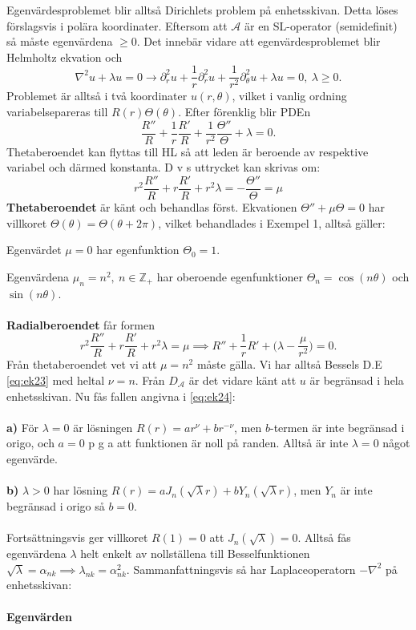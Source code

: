 \documentclass{article}
\begin{document}
Egenvärdesproblemet blir alltså Dirichlets problem på enhetsskivan. Detta löses förslagsvis i polära koordinater. Eftersom att $\mathcal{A}$ är en SL-operator (semidefinit) så måste egenvärdena $\geq 0$. Det innebär vidare att egenvärdesproblemet blir Helmholtz ekvation och 
$$
\nabla^2u+\lambda u=0 \rightarrow \partial_r^2u+\frac{1}{r}\partial_r^2u+\frac{1}{r^2}\partial_{\theta}^2u+\lambda u=0, \ \lambda\geq 0.
$$
Problemet är alltså i två koordinater $u(r,\theta)$, vilket i vanlig ordning variabelsepareras till $R(r)\Theta(\theta)$. Efter förenklig blir PDEn
$$
\frac{R''}{R}+\frac{1}{r}\frac{R'}{R}+\frac{1}{r^2}\frac{\Theta''}{\Theta}+\lambda=0.
$$
Thetaberoendet kan flyttas till HL så att leden är beroende av respektive variabel och därmed konstanta. D v s uttrycket kan skrivas om:
$$
r^2\frac{R''}{R}+r\frac{R'}{R}+r^2\lambda=-\frac{\Theta''}{\Theta}=\mu
$$
\textbf{Thetaberoendet} är känt och behandlas först. Ekvationen $\Theta''+\mu\Theta=0$ har villkoret $\Theta(\theta)=\Theta(\theta+2\pi)$, vilket behandlades i Exempel 1, alltså gäller:

Egenvärdet $\mu=0$ har egenfunktion $\Theta_0=1$.

Egenvärdena $\mu_n=n^2, \ n\in\mathbb{Z}_+$ har oberoende egenfunktioner $\Theta_n=\cos(n\theta)$ och $\sin(n\theta)$.\\ \\
\textbf{Radialberoendet} får formen
$$
r^2\frac{R''}{R}+r\frac{R'}{R}+r^2\lambda=\mu\implies R''+\frac{1}{r}R'+\Big(\lambda-\frac{\mu}{r^2}\Big)=0.
$$
Från thetaberoendet vet vi att $\mu=n^2$ måste gälla. Vi har alltså Bessels D.E \eqref{eq:ek23} med heltal $\nu=n$. Från $D_{\mathcal{A}}$ är det vidare känt att $u$ är begränsad i hela enhetsskivan. Nu fås fallen angivna i \eqref{eq:ek24}:\\ \\
\textbf{a)} För $\lambda=0$ är lösningen $R(r)=ar^{\nu}+br^{-\nu}$, men $b$-termen är inte begränsad i origo, och $a=0$ p g a att funktionen är noll på randen. Alltså är inte $\lambda=0$ något egenvärde.\\ \\
\textbf{b)} $\lambda>0$ har lösning $R(r)=aJ_n(\sqrt{\lambda}r)+bY_n(\sqrt{\lambda}r)$, men $Y_n$ är inte begränsad i origo så $b=0$.\\ \\
Fortsättningsvis ger villkoret $R(1)=0$ att $J_n(\sqrt{\lambda})=0$. Alltså fås egenvärdena $\lambda$ helt enkelt av nollställena till Besselfunktionen $\sqrt{\lambda}=\alpha_{nk}\implies \lambda_{nk}=\alpha_{nk}^2$. Sammanfattningsvis så har Laplaceoperatorn $-\nabla^2$ på enhetsskivan:\\ \\
\textbf{Egenvärden} 
\end{document}
